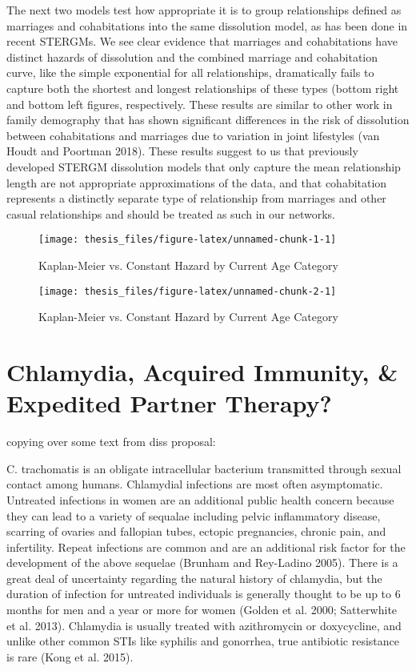 \documentclass [11pt, proquest] {uwthesis}[2015/03/03]
\begin{document}
The next two models test how appropriate it is to group relationships
defined as marriages and cohabitations into the same dissolution model,
as has been done in recent STERGMs. We see clear evidence that marriages
and cohabitations have distinct hazards of dissolution and the combined
marriage and cohabitation curve, like the simple exponential for all
relationships, dramatically fails to capture both the shortest and
longest relationships of these types (bottom right and bottom left
figures, respectively. These results are similar to other work in family
demography that has shown significant differences in the risk of
dissolution between cohabitations and marriages due to variation in
joint lifestyles (van Houdt and Poortman 2018). These results suggest to
us that previously developed STERGM dissolution models that only capture
the mean relationship length are not appropriate approximations of the
data, and that cohabitation represents a distinctly separate type of
relationship from marriages and other casual relationships and should be
treated as such in our networks.
\begin{figure}

{\centering \texttt{[image: thesis\_files/figure-latex/unnamed-chunk-1-1]} 

}

\caption{Kaplan-Meier vs. Constant Hazard by Current Age Category}\label{fig:unnamed-chunk-1}
\end{figure}
\begin{figure}

{\centering \texttt{[image: thesis\_files/figure-latex/unnamed-chunk-2-1]} 

}

\caption{Kaplan-Meier vs. Constant Hazard by Current Age Category}\label{fig:unnamed-chunk-2}
\end{figure}
\chapter{Chlamydia, Acquired Immunity, \& Expedited Partner
Therapy?}\label{ept}

copying over some text from diss proposal:

C. trachomatis is an obligate intracellular bacterium transmitted
through sexual contact among humans. Chlamydial infections are most
often asymptomatic. Untreated infections in women are an additional
public health concern because they can lead to a variety of sequalae
including pelvic inflammatory disease, scarring of ovaries and fallopian
tubes, ectopic pregnancies, chronic pain, and infertility. Repeat
infections are common and are an additional risk factor for the
development of the above sequelae (Brunham and Rey-Ladino 2005). There
is a great deal of uncertainty regarding the natural history of
chlamydia, but the duration of infection for untreated individuals is
generally thought to be up to 6 months for men and a year or more for
women (Golden et al. 2000; Satterwhite et al. 2013). Chlamydia is
usually treated with azithromycin or doxycycline, and unlike other
common STIs like syphilis and gonorrhea, true antibiotic resistance is
rare (Kong et al. 2015).
\end{document}
